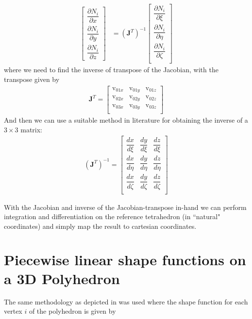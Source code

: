 \documentclass[11pt,letterpaper,titlepage]{article}
\newcommand{\beqn}{\begin{equation}
	\begin{aligned}}
\newcommand{\eeqn}{\end{aligned}
	\end{equation}}
\begin{document}
\begingroup
\renewcommand*{\arraystretch}{1.5}
\beqn \label{eq:derivativeNtetrahedron}
\begin{bmatrix}
\dfrac{\partial N_i}{\partial x} \\
\dfrac{\partial N_i}{\partial y} \\
\dfrac{\partial N_i}{\partial z}
\end{bmatrix}
&=
(\mathbf{J}^T)^{-1}
\begin{bmatrix}
\dfrac{\partial N_i}{\partial \xi} \\
\dfrac{\partial N_i}{\partial \eta} \\
\dfrac{\partial N_i}{\partial \zeta} \\
\end{bmatrix}
\eeqn 
\endgroup
where we need to find the inverse of transpose of the Jacobian, with the transpose given by
\begingroup
\renewcommand*{\arraystretch}{1.5}
\beqn \label{eq:jacobiantransposetetrahedron} 
\mathbf{J }^T=
\begin{bmatrix}
\text{v}_{01x}  & \text{v}_{01y} & \text{v}_{01z}  \\
\text{v}_{02x}  & \text{v}_{02y} & \text{v}_{02z}  \\
\text{v}_{03x}  & \text{v}_{03y} & \text{v}_{03z}  \\
\end{bmatrix}
\eeqn
\endgroup
And then we can use a suitable method in literature for obtaining the inverse of a $3\times3$ matrix:
\begingroup
\renewcommand*{\arraystretch}{1.5}
\beqn \label{eq:jacobiantransposeinversetetrahedron} 
(\mathbf{J }^T)^{-1}=
\begin{bmatrix}
\dfrac{dx}{d\xi}     & \dfrac{dy}{d\xi}  &  \dfrac{dz}{d\xi} \\
\dfrac{dx}{d\eta}     & \dfrac{dy}{d\eta}  &  \dfrac{dz}{d\eta} \\
\dfrac{dx}{d\zeta}     & \dfrac{dy}{d\zeta}  &  \dfrac{dz}{d\zeta} \\
\end{bmatrix}
\eeqn
\endgroup

With the Jacobian and inverse of the Jacobian-transpose in-hand we can perform integration and differentiation on the reference tetrahedron (in ``natural" coordinates) and simply map the result to cartesian coordinates.

\section{Piecewise linear shape functions on a 3D Polyhedron}
The same methodology as depicted in \cite{BaileyAdamsPolyhedral} was used where the shape function for each vertex $i$ of the polyhedron is given by
\end{document}
